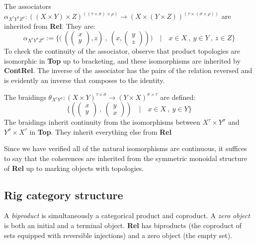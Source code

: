 The associators $\alpha_{X^{\tau}Y^{\sigma}Z^{\rho}} : ((X \times Y) \times Z)^{((\tau \times \sigma) \times \rho)} \rightarrow (X \times (Y \times Z))^{(\tau \times (\sigma \times \rho))}$ are inherited from \textbf{Rel}. They are:
\[\alpha_{X^{\tau}Y^{\sigma}Z^{\rho}} := \{\big( \ (\begin{pmatrix} x \\ y \end{pmatrix} , z) \ , \ (x, \begin{pmatrix} y \\ z \end{pmatrix}) \big) \quad | \quad x \in X \ , \ y \in Y \ ,\ z \in Z \}\]
To check the continuity of the associator, observe that product topologies are isomorphic in \textbf{Top} up to bracketing, and these isomorphisms are inherited by \textbf{ContRel}. The inverse of the associator has the pairs of the relation reversed and is evidently an inverse that composes to the identity.

The braidings $\theta_{X^{\tau}Y^{\sigma}} : (X \times Y)^{\tau \times \sigma} \rightarrow (Y \times X)^{\sigma \times \tau}$ are defined:
\[\{(\begin{pmatrix} x \\ y \end{pmatrix} \ , \ \begin{pmatrix} y \\ x \end{pmatrix}) \quad | \quad x \in X \ , \ y \in Y  \}\]
The braidings inherit continuity from the isomorphisms between $X^\tau \times Y^\sigma$ and $Y^\sigma \times X^\tau$ in \textbf{Top}. They inherit everything else from \textbf{Rel}

Since we have verified all of the natural isomorphisms are continuous, it suffices to say that the coherences are inherited from the symmetric monoidal structure of \textbf{Rel} up to marking objects with topologies.

\subsection{Rig category structure}

\begin{defn}
A \emph{biproduct} is simultaneously a categorical product and coproduct. A \emph{zero object} is both an initial and a terminal object. \textbf{Rel} has biproducts (the coproduct of sets equipped with reversible injections) and a zero object (the empty set).
\end{defn}

